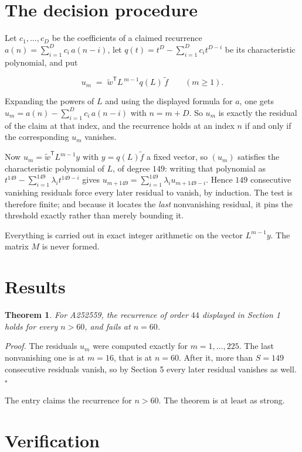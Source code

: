 \documentclass[11pt]{article}
\newtheorem{theorem}{Theorem}
\theoremstyle{definition}
\begin{document}
\section{The decision procedure}

Let $c_1,\dots,c_D$ be the coefficients of a claimed recurrence $a(n) = \sum_{i=1}^{D} c_i\,a(n-i)$, let $q(t) = t^{D} - \sum_{i=1}^{D} c_i t^{D-i}$ be its characteristic polynomial, and put

\[u_m \;=\; \tilde w^{\mathsf T} L^{\,m-1} q(L)\,\tilde f \qquad (m \ge 1).\]

Expanding the powers of $L$ and using the displayed formula for $a$, one gets $u_m = a(n) - \sum_{i=1}^{D} c_i\,a(n-i)$ with $n = m + D$. So $u_m$ is exactly the residual of the claim at that index, and the recurrence holds at an index $n$ if and only if the corresponding $u_m$ vanishes.

Now $u_m = \tilde w^{\mathsf T} L^{m-1} y$ with $y = q(L)\tilde f$ a fixed vector, so $(u_m)$ satisfies the characteristic polynomial of $L$, of degree $149$: writing that polynomial as $t^{149} - \sum_{i=1}^{149} \lambda_i t^{149-i}$ gives $u_{m+149} = \sum_{i=1}^{149} \lambda_i u_{m+149-i}$. Hence $149$ consecutive vanishing residuals force every later residual to vanish, by induction. The test is therefore finite; and because it locates the {\itshape last} nonvanishing residual, it pins the threshold exactly rather than merely bounding it.

Everything is carried out in exact integer arithmetic on the vector $L^{m-1}y$. The matrix $M$ is never formed.

\section{Results}

\begin{theorem} For A252559, the recurrence of order $44$ displayed in Section 1 holds for every $n > 60$, and fails at $n = 60$.\end{theorem}

{\itshape Proof.} The residuals $u_m$ were computed exactly for $m = 1,\dots,225$. The last nonvanishing one is at $m = 16$, that is at $n = 60$. After it, more than $S = 149$ consecutive residuals vanish, so by Section 5 every later residual vanishes as well. $\square$

The entry claims the recurrence for $n > 60$. The theorem is at least as strong.

\section{Verification}
\end{document}
